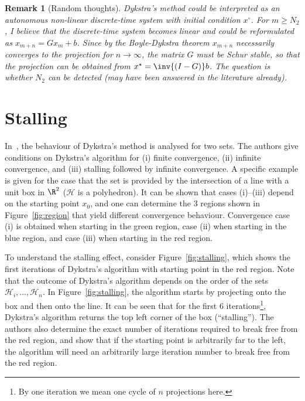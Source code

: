 \documentclass[hidelinks]{article}
\newtheorem{remark}{Remark}
\begin{document}
\begin{remark}[Random thoughts]
Dykstra's method could be interpreted as an autonomous non-linear discrete-time system with initial condition $x^\circ$. For $m\geq N_2$, I believe that the discrete-time system becomes \emph{linear} and could be reformulated as $x_{m+n} = G x_m + b$.
Since by the Boyle-Dykstra theorem $x_{m+n}$ necessarily converges to the projection for $n\rightarrow\infty$, the matrix $G$ must be Schur stable, so that the projection can be obtained from $x^\star = \inv{\left(I-G\right)} b$. The question is whether $N_2$ can be detected (may have been answered in the literature already).
\end{remark}

\section{Stalling}

In~\cite{DYKSTRASTALLING}, the behaviour of Dykstra's method is analysed for two sets. The authors give conditions on Dykstra's algorithm for (i) finite convergence, (ii) infinite convergence, and (iii) stalling followed by infinite convergence. A specific example is given for the case that the set is provided by the intersection of a line with a unit box in $\R^2$ ($\mathcal{H}$ is a polyhedron). It can be shown that cases (i)--(iii) depend on the starting point $x_0$, and one can determine the 3 regions shown in Figure~\ref{fig:region} that yield different convergence behaviour. Convergence case (i) is obtained when starting in the green region, case (ii) when starting in the blue region, and case (iii) when starting in the red region.

To understand the stalling effect, consider Figure~\ref{fig:stalling}, which shows the first iterations of Dykstra's algorithm with starting point in the red region. Note that the outcome of Dykstra's algorithm depends on the order of the sets $\mathcal{H}_i,\dots,\mathcal{H}_n$. In Figure~\ref{fig:stalling}, the algorithm starts by projecting onto the box and then onto the line. It can be seen that for the first 6 iterations\footnote{By one iteration we mean one cycle of $n$ projections here.}, Dykstra's algorithm returns the top left corner of the box (``stalling''). The authors also determine the exact number of iterations required to break free from the red region, and show that if the starting point is arbitrarily far to the left, the algorithm will need an arbitrarily large iteration number to break free from the red region.
\end{document}
